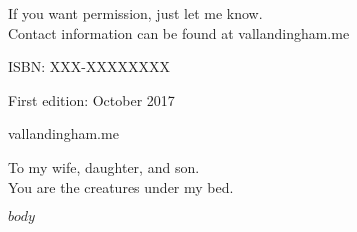 \documentclass[10pt]{book}
\newcommand\blankpage{%
    \null
    \thispagestyle{empty}%
    \addtocounter{page}{-1}%
    \newpage}
\begin{document}
  If you want permission, just let me know.\\
  Contact information can be found at vallandingham.me


  ISBN: XXX-XXXXXXXX

  First edition: October 2017

  \vfill
  vallandingham.me
  \vspace*{2\baselineskip}
  \clearpage
  \endgroup

  \begingroup
  \vspace*{\fill}
  \begin{center}
  To my wife, daughter, and son.\\
  You are the creatures under my bed.
  \end{center}
  \vspace*{\fill}
  \afterpage{\blankpage}
  \endgroup
  \setcounter{page}{0}
  \clearpage



  \pagestyle{fancy}

  $body$
\end{document}
